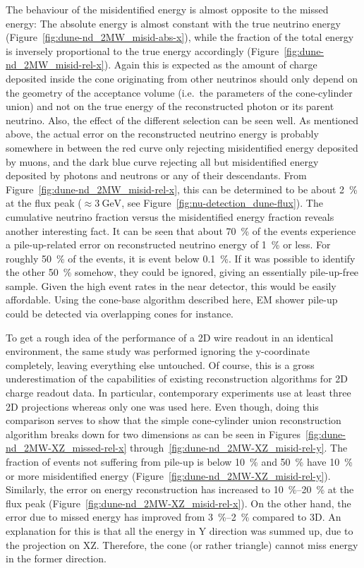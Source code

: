 The behaviour of the misidentified energy is almost opposite to the missed energy: The absolute energy is almost constant with the true neutrino energy (Figure~\ref{fig:dune-nd_2MW_misid-abs-x}), while the fraction of the total energy is inversely proportional to the true energy accordingly (Figure~\ref{fig:dune-nd_2MW_misid-rel-x}).
Again this is expected as the amount of charge deposited inside the cone originating from other neutrinos should only depend on the geometry of the acceptance volume (i.e.\ the parameters of the cone-cylinder union) and not on the true energy of the reconstructed photon or its parent neutrino.
Also, the effect of the different selection can be seen well.
As mentioned above, the actual error on the reconstructed neutrino energy is probably somewhere in between the red curve only rejecting misidentified energy deposited by muons, and the dark blue curve rejecting all but misidentified energy deposited by photons and neutrons or any of their descendants.
From Figure~\ref{fig:dune-nd_2MW_misid-rel-x}, this can be determined to be about \SI{2}{\percent} at the flux peak ($\approx \SI{3}{\giga\electronvolt}$, see Figure~\ref{fig:nu-detection_dune-flux}).
The cumulative neutrino fraction versus the misidentified energy fraction reveals another interesting fact.
It can be seen that about \SI{70}{\percent} of the events experience a pile-up-related error on reconstructed neutrino energy of \SI{1}{\percent} or less.
For roughly \SI{50}{\percent} of the events, it is event below \SI{0.1}{\percent}.
If it was possible to identify the other \SI{50}{\percent} somehow, they could be ignored, giving an essentially pile-up-free sample.
Given the high event rates in the near detector, this would be easily affordable.
Using the cone-base algorithm described here, EM shower pile-up could be detected via overlapping cones for instance.

To get a rough idea of the performance of a 2D wire readout in an identical environment, the same study was performed ignoring the y-coordinate completely, leaving everything else untouched.
Of course, this is a gross underestimation of the capabilities of existing reconstruction algorithms for 2D charge readout data.
In particular, contemporary experiments use at least three 2D projections whereas only one was used here.
Even though, doing this comparison serves to show that the simple cone-cylinder union reconstruction algorithm breaks down for two dimensions as can be seen in Figures~\ref{fig:dune-nd_2MW-XZ_missed-rel-x} through~\ref{fig:dune-nd_2MW-XZ_misid-rel-y}.
The fraction of events not suffering from pile-up is below \SI{10}{\percent} and \SI{50}{\percent} have \SI{10}{\percent} or more misidentified energy (Figure~\ref{fig:dune-nd_2MW-XZ_misid-rel-y}).
Similarly, the error on energy reconstruction has increased to \SIrange{10}{20}{\percent} at the flux peak (Figure~\ref{fig:dune-nd_2MW-XZ_misid-rel-x}).
On the other hand, the error due to missed energy has improved from \SIrange{3}{2}{\percent} compared to 3D.
An explanation for this is that all the energy in Y direction was summed up, due to the projection on XZ.
Therefore, the cone (or rather triangle) cannot miss energy in the former direction.

